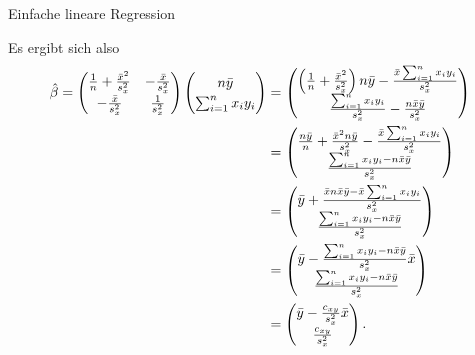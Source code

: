 \documentclass[
  8pt,
  ignorenonframetext,
]{beamer}
\begin{document}
\begin{frame}{Einfache lineare Regression}
\protect\hypertarget{einfache-lineare-regression-5}{}
\footnotesize

Es ergibt sich also \begin{align}
\renewcommand{\arraystretch}{1.2}
\begin{split}
\hat{\beta}
= \begin{pmatrix}
  \frac{1}{n} + \frac{\bar{x}^2}{s_x^2}
& -\frac{\bar{x}}{s_x^2}
\\
  -\frac{\bar{x}}{s_x^2}
&  \frac{1}{s_x^2}
\end{pmatrix}
\begin{pmatrix}
n\bar{y}    \\
\sum_{i=1}^n x_i y_i    \\
\end{pmatrix}
& = \begin{pmatrix}
\left(\frac{1}{n} + \frac{\bar{x}^2}{s_x^2}\right)n\bar{y} - \frac{\bar{x}\sum_{i=1}^n x_iy_i}{s_x^2}   \\
\frac{\sum_{i=1}^n x_i y_i }{s_x^2} - \frac{n\bar{x}\bar{y}}{s_x^2} \\
\end{pmatrix}
\\
&
=
\begin{pmatrix}
\frac{n\bar{y}}{n} + \frac{\bar{x}^2n\bar{y}}{s_x^2}- \frac{\bar{x}\sum_{i=1}^n x_iy_i}{s_x^2}
\\
\frac{\sum_{i=1}^n x_i y_i - n\bar{x}\bar{y}}{s_x^2}    \\
\end{pmatrix}
\\
& =
\begin{pmatrix}
\bar{y} + \frac{\bar{x}n\bar{x}\bar{y} - \bar{x}\sum_{i=1}^n x_iy_i}{s_x^2}
\\
\frac{\sum_{i=1}^n x_i y_i - n\bar{x}\bar{y}}{s_x^2}    \\
\end{pmatrix}
\\
& =
\begin{pmatrix}
\bar{y} - \frac{\sum_{i=1}^n x_iy_i - n\bar{x}\bar{y}}{s_x^2}\bar{x}
\\
\frac{\sum_{i=1}^n x_i y_i - n\bar{x}\bar{y}}{s_x^2}
\end{pmatrix}
\\
& =
\begin{pmatrix}
\bar{y} - \frac{c_{xy}}{s_x^2}\bar{x}
\\
\frac{c_{xy}}{s_x^2}
\end{pmatrix}.
\end{split}
\end{align}
\end{frame}
\end{document}
